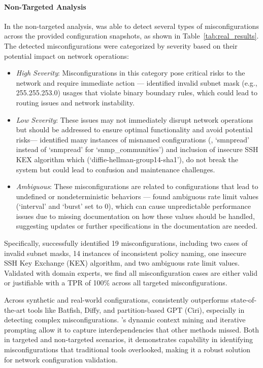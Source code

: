 \paragraph{Non-Targeted Analysis}
In the non-targeted analysis, \sysname{} was able to detect several types of misconfigurations across the provided configuration snapshots, as shown in Table~\ref{tab:real_results}.
The detected misconfigurations were categorized by severity based on their potential impact on network operations:
\begin{itemize}
    \item \textit{High Severity}: Misconfigurations in this category pose critical risks to the network and require immediate action --- \sysname{} identified invalid subnet mask (e.g., 255.255.253.0) usages that violate binary boundary rules, which could lead to routing issues and network instability.
    \item \textit{Low Severity}: These issues may not immediately disrupt network operations but should be addressed to ensure optimal functionality and avoid potential risks---
    \sysname{} identified many instances of misnamed configurations (\eg, `smnpread' instead of `snmpread' for `snmp\_communities') and inclusion of insecure SSH KEX algorithm which (`diffie-hellman-group14-sha1'), do not break the system but could lead to confusion and maintenance challenges.
    \item \textit{Ambiguous}: These misconfigurations are related to configurations that lead to undefined or nondeterministic behaviors --- \sysname{} found ambiguous rate limit values (`interval' and `burst' set to 0), which can cause unpredictable performance issues due to missing documentation on how these values should be handled, suggesting updates or further specifications in the documentation are needed.
\end{itemize}

Specifically, \sysname{} successfully identified 19 misconfigurations, including two cases of invalid subnet masks, 14 instances of inconsistent policy naming, one insecure SSH Key Exchange (KEX) algorithm, and two ambiguous rate limit values. Validated with domain experts, we find all misconfiguration cases are either valid or justifiable with a TPR of 100\% across all targeted misconfigurations.

Across synthetic and real-world configurations, \sysname{} consistently outperforms state-of-the-art tools like Batfish, Diffy, and partition-based GPT (Ciri), especially in detecting complex misconfigurations. \sysname{}'s dynamic context mining and iterative prompting allow it to capture interdependencies that other methods missed. Both in targeted and non-targeted scenarios, it demonstrates capability in identifying misconfigurations that traditional tools overlooked, making it a robust solution for network configuration validation.
